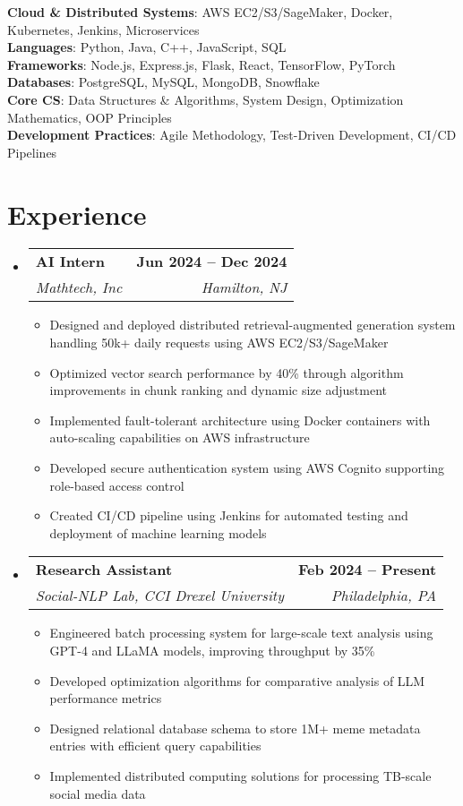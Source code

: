 \documentclass[letterpaper,11pt]{article}
\makeatletter
\newcommand{\resumeItem}[1]{
  \item\small{
    {#1 \vspace{-2pt}}
  }
}
\newcommand{\resumeSubheading}[4]{
  \vspace{-2pt}\item
    \begin{tabular*}{1.0\textwidth}[t]{l@{\extracolsep{\fill}}r}
      \textbf{#1} & \textbf{\small #2} \\
      \textit{\small#3} & \textit{\small #4} \\
    \end{tabular*}\vspace{-7pt}
}
\newcommand{\resumeSubHeadingListStart}{\begin{itemize}[leftmargin=0.0in, label={}]}
\newcommand{\resumeSubHeadingListEnd}{\end{itemize}}
\newcommand{\resumeItemListStart}{\begin{itemize}}
\newcommand{\resumeItemListEnd}{\end{itemize}\vspace{-5pt}}
\makeatother
\begin{document}
\begin{itemize}[leftmargin=0.15in, label={}]
	\small{\item{
		\textbf{Cloud \& Distributed Systems}{: AWS EC2/S3/SageMaker, Docker, Kubernetes, Jenkins, Microservices} \\
		\textbf{Languages}{: Python, Java, C++, JavaScript, SQL} \\
		\textbf{Frameworks}{: Node.js, Express.js, Flask, React, TensorFlow, PyTorch} \\
		\textbf{Databases}{: PostgreSQL, MySQL, MongoDB, Snowflake} \\
		\textbf{Core CS}{: Data Structures \& Algorithms, System Design, Optimization Mathematics, OOP Principles} \\
            \textbf{Development Practices}{: Agile Methodology, Test-Driven Development, CI/CD Pipelines}}
	}
\end{itemize}
\vspace{-15pt}

\section{Experience}
  \resumeSubHeadingListStart
    \resumeSubheading
    {AI Intern}{Jun 2024 -- Dec 2024}
    {Mathtech, Inc}{Hamilton, NJ}
    \resumeItemListStart
        \resumeItem{Designed and deployed distributed retrieval-augmented generation system handling 50k+ daily requests using AWS EC2/S3/SageMaker}
        \resumeItem{Optimized vector search performance by 40\% through algorithm improvements in chunk ranking and dynamic size adjustment}
        \resumeItem{Implemented fault-tolerant architecture using Docker containers with auto-scaling capabilities on AWS infrastructure}
        \resumeItem{Developed secure authentication system using AWS Cognito supporting role-based access control}
        \resumeItem{Created CI/CD pipeline using Jenkins for automated testing and deployment of machine learning models}
    \resumeItemListEnd
    \resumeSubheading
    {Research Assistant}{Feb 2024 -- Present}
    {Social-NLP Lab, CCI Drexel University}{Philadelphia, PA}
    \resumeItemListStart
        \resumeItem{Engineered batch processing system for large-scale text analysis using GPT-4 and LLaMA models, improving throughput by 35\%}
        \resumeItem{Developed optimization algorithms for comparative analysis of LLM performance metrics}
        \resumeItem{Designed relational database schema to store 1M+ meme metadata entries with efficient query capabilities}
        \resumeItem{Implemented distributed computing solutions for processing TB-scale social media data}
    \resumeItemListEnd
\resumeSubHeadingListEnd
\vspace{-15pt}
\end{document}
